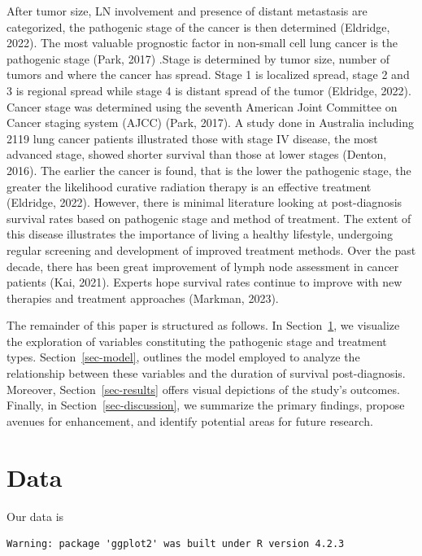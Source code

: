 \documentclass[
  letterpaper,
  DIV=11,
  numbers=noendperiod]{scrartcl}
\begin{document}
After tumor size, LN involvement and presence of distant metastasis are
categorized, the pathogenic stage of the cancer is then determined
(Eldridge, 2022). The most valuable prognostic factor in non-small cell
lung cancer is the pathogenic stage (Park, 2017) .Stage is determined by
tumor size, number of tumors and where the cancer has spread. Stage 1 is
localized spread, stage 2 and 3 is regional spread while stage 4 is
distant spread of the tumor (Eldridge, 2022). Cancer stage was
determined using the seventh American Joint Committee on Cancer staging
system (AJCC) (Park, 2017). A study done in Australia including 2119
lung cancer patients illustrated those with stage IV disease, the most
advanced stage, showed shorter survival than those at lower stages
(Denton, 2016). The earlier the cancer is found, that is the lower the
pathogenic stage, the greater the likelihood curative radiation therapy
is an effective treatment (Eldridge, 2022). However, there is minimal
literature looking at post-diagnosis survival rates based on pathogenic
stage and method of treatment. The extent of this disease illustrates
the importance of living a healthy lifestyle, undergoing regular
screening and development of improved treatment methods. Over the past
decade, there has been great improvement of lymph node assessment in
cancer patients (Kai, 2021). Experts hope survival rates continue to
improve with new therapies and treatment approaches (Markman, 2023).

The remainder of this paper is structured as follows. In
Section~\ref{sec-data}, we visualize the exploration of variables
constituting the pathogenic stage and treatment types.
Section~\ref{sec-model}, outlines the model employed to analyze the
relationship between these variables and the duration of survival
post-diagnosis. Moreover, Section~\ref{sec-results} offers visual
depictions of the study's outcomes. Finally, in
Section~\ref{sec-discussion}, we summarize the primary findings, propose
avenues for enhancement, and identify potential areas for future
research.

\hypertarget{sec-data}{%
\section{Data}\label{sec-data}}

Our data is

\begin{verbatim}
Warning: package 'ggplot2' was built under R version 4.2.3
\end{verbatim}
\end{document}
